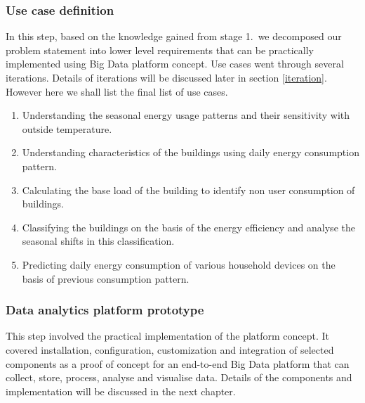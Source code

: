 \subsubsection{Use case definition} \label{usecases}
In this step, based on the knowledge gained from stage 1.\ we decomposed our problem statement into lower level requirements that can be practically implemented using Big Data platform concept. Use cases went through several iterations. Details of iterations will be discussed later in section \ref{iteration}. However here we shall list the final list of use cases.
\begin{enumerate}
\item Understanding the seasonal energy usage patterns and their sensitivity with outside temperature.
\item Understanding characteristics of the buildings using daily energy consumption pattern.
\item Calculating the base load of the building to identify non user consumption of buildings.
\item Classifying the buildings on the basis of the energy efficiency and analyse the seasonal shifts in this classification.
\item Predicting daily energy consumption of various household devices on the basis of previous consumption pattern.
\end{enumerate}
\subsubsection{Data analytics platform prototype}
This step involved the practical implementation of the platform concept. It covered installation, configuration, customization and integration of selected components as a proof of concept for an end-to-end Big Data platform that can collect, store, process, analyse and visualise data. Details of the components and implementation will be discussed in the next chapter.
